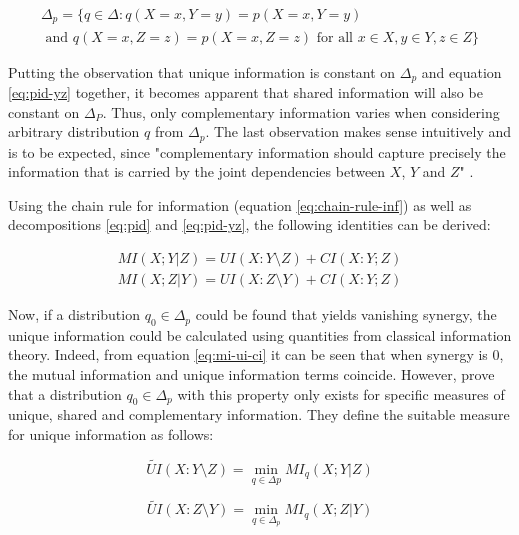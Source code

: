 \documentclass[12pt]{article}
\begin{document}
\begin{multline*}
\Delta_p = \{q \in \Delta: q(X=x, Y=y) = p(X=x, Y=y) \\ 
\text{ and }  q(X=x, Z=z) = p(X=x, Z=z) \text{ for all } x \in X, y \in Y, z \in Z\}
\end{multline*}

Putting the observation that unique information is constant on $\Delta_p$ and equation \ref{eq:pid-yz} together, it becomes apparent that shared information will also be constant on $\Delta_P$. Thus, only complementary information varies when considering arbitrary distribution $q$ from $\Delta_p$. The last observation makes sense intuitively and is to be expected, since "complementary information should capture precisely the information that is carried by the joint dependencies between $X$, $Y$ and $Z$" \cite{bertschinger}. 

Using the chain rule for information (equation \ref{eq:chain-rule-inf}) as well as decompositions \ref{eq:pid} and \ref{eq:pid-yz}, the following identities can be derived: 

\begin{equation}
\begin{split}
MI(X;Y|Z) = UI(X:Y \setminus Z) + CI(X:Y;Z) \\ 
MI(X;Z|Y) = UI(X:Z \setminus Y) + CI(X:Y;Z)
\label{eq:mi-ui-ci}
\end{split}
\end{equation}

Now, if a distribution $q_0 \in \Delta_p$ could be found that yields vanishing synergy, the unique information could be calculated using quantities from classical information theory. Indeed, from equation \ref{eq:mi-ui-ci} it can be seen that when synergy is $0$, the mutual information and unique information terms coincide. However, \cite{bertschinger} prove that a distribution $q_0 \in \Delta_p$ with this property only exists for specific measures of unique, shared and complementary information. They define the suitable measure for unique information as follows:

\begin{equation}
\widetilde{UI}(X:Y \setminus Z) = \min_{q \in \Delta p} MI_q(X;Y|Z)
\label{eq:tilde_ui_y}
\end{equation}

\begin{equation}
\widetilde{UI}(X:Z \setminus Y) = \min_{q \in \Delta_p} MI_q(X;Z|Y)
\label{eq:tilde_ui_z}
\end{equation}
\end{document}
